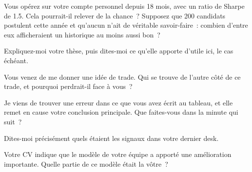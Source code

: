 \begin{question}\label{iq:iv2:your-strategy-and-your-project:6}
Vous opérez sur votre compte personnel depuis 18 mois, avec un ratio de Sharpe de 1.5. Cela pourrait-il relever de la chance~? Supposez que 200 candidats postulent cette année et qu'aucun n'ait de véritable savoir-faire~: combien d'entre eux afficheraient un historique au moins aussi bon~?
\end{question}

\begin{question}\label{iq:iv2:your-strategy-and-your-project:7}
Expliquez-moi votre thèse, puis dites-moi ce qu'elle apporte d'utile ici, le cas échéant.
\end{question}

\begin{question}\label{iq:iv2:your-strategy-and-your-project:8}
Vous venez de me donner une idée de trade. Qui se trouve de l'autre côté de ce trade, et pourquoi perdrait-il face à vous~?
\end{question}

\begin{question}\label{iq:iv2:your-strategy-and-your-project:9}
Je viens de trouver une erreur dans ce que vous avez écrit au tableau, et elle remet en cause votre conclusion principale. Que faites-vous dans la minute qui suit~?
\end{question}

\begin{question}\label{iq:iv2:your-strategy-and-your-project:10}
Dites-moi précisément quels étaient les signaux dans votre dernier desk.
\end{question}

\begin{question}\label{iq:iv2:your-strategy-and-your-project:11}
Votre CV indique que le modèle de votre équipe a apporté une amélioration importante. Quelle partie de ce modèle était la vôtre~?
\end{question}

